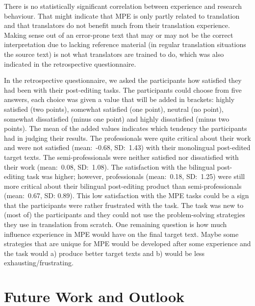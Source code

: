 \documentclass[output=paper]{langsci/langscibook}
\begin{document}
There is no statistically significant correlation between experience and research behaviour. That might indicate that MPE is only partly related to translation and that translators do not benefit much from their translation experience. Making sense out of an error-prone text that may or may not be the correct interpretation due to lacking reference material (in regular translation situations the source text) is not what translators are trained to do, which was also indicated in the retrospective questionnaire.



In the retrospective questionnaire, we asked the participants how satisfied they had been with their post-editing tasks. The participants could choose from five answers, each choice was given a value that will be added in brackets: highly satisfied (two points), somewhat satisfied (one point), neutral (no point), somewhat dissatisfied (minus one point) and highly dissatisfied (minus two points). The mean of the added values indicates which tendency the participants had in judging their results. The professionals were quite critical about their work and were not satisfied (mean:~-0.68, SD:~1.43) with their monolingual post-edited target texts. The semi-professionals were neither satisfied nor dissatisfied with their work (mean:~0.08, SD:~1.08). The satisfaction with the bilingual post-editing task was higher; however, professionals (mean:~0.18, SD:~1.25) were still more critical about their bilingual post-editing product than semi-professionals (mean:~0.67, SD: 0.89). This low satisfaction with the MPE tasks could be a sign that the participants were rather frustrated with the task. The task was new to (most of) the participants and they could not use the problem-solving strategies they use in translation from scratch. One remaining question is how much influence experience in MPE would have on the final target text. Maybe some strategies that are unique for MPE would be developed after some experience and the task would a) produce better target texts and b) would be less exhausting/frustrating.


\section{Future Work and Outlook\label{nitzke:sec:FutureWorkAndOutlook}}
\end{document}
